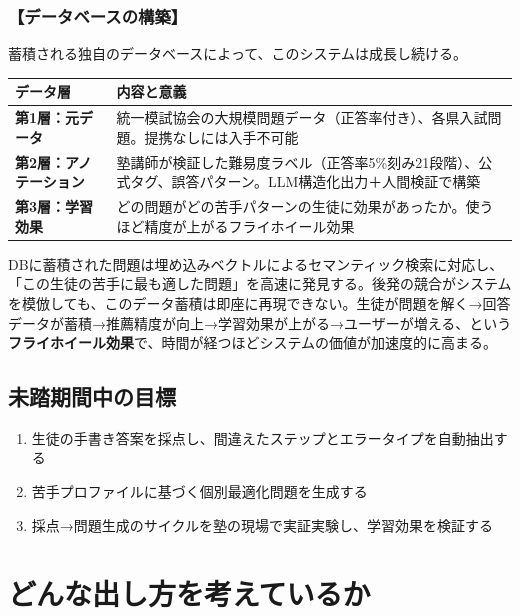 \documentclass[paper=a4,fontsize=10.5bp,jafontsize=10.5bp,twocolumn]{jlreq}
\begin{document}
\subsubsection{【データベースの構築】}

蓄積される独自のデータベースによって、このシステムは成長し続ける。

\begin{scriptsize}\noindent
\begin{tabularx}{\linewidth}{>{\bfseries}l X}
\toprule
データ層 & 内容と意義 \\
\midrule
第1層：元データ & 統一模試協会の大規模問題データ（正答率付き）、各県入試問題。提携なしには入手不可能 \\
第2層：アノテーション & 塾講師が検証した難易度ラベル（正答率5\%刻み21段階）、公式タグ、誤答パターン。LLM構造化出力＋人間検証で構築 \\
第3層：学習効果 & どの問題がどの苦手パターンの生徒に効果があったか。使うほど精度が上がるフライホイール効果 \\
\bottomrule
\end{tabularx}
\end{scriptsize}

DBに蓄積された問題は埋め込みベクトルによるセマンティック検索に対応し、「この生徒の苦手に最も適した問題」を高速に発見する。後発の競合がシステムを模倣しても、このデータ蓄積は即座に再現できない。生徒が問題を解く→回答データが蓄積→推薦精度が向上→学習効果が上がる→ユーザーが増える、という\textbf{フライホイール効果}で、時間が経つほどシステムの価値が加速度的に高まる。

\subsection{未踏期間中の目標}

\begin{enumerate}[leftmargin=2em]
  \item 生徒の手書き答案を採点し、間違えたステップとエラータイプを自動抽出する
  \item 苦手プロファイルに基づく個別最適化問題を生成する
  \item 採点→問題生成のサイクルを塾の現場で実証実験し、学習効果を検証する
\end{enumerate}

\section{どんな出し方を考えているか}
\end{document}
